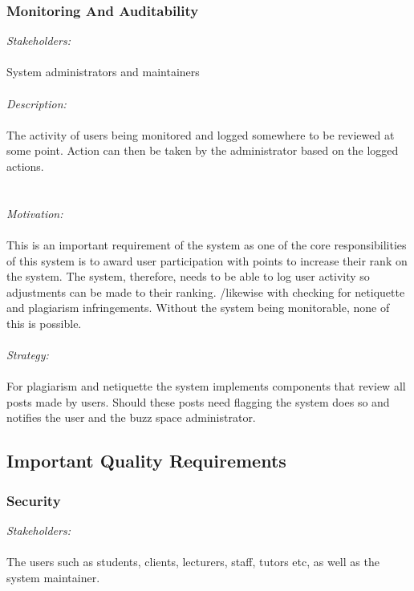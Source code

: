 \documentclass[a4paper,12pt]{report}
\begin{document}
		\subsubsection{Monitoring And Auditability}
		\emph{Stakeholders: }\\\\ System administrators and maintainers\\\\
		
		\emph{Description: }\\\\ The activity of users being monitored and logged somewhere to be reviewed at some point. Action can then be taken by the administrator based on the logged actions. \\\\	
		\\\emph{Motivation: }\\\\ This is an important requirement of the system as one of the core responsibilities of this system is to award user participation with points to increase their rank on the system. The system, therefore, needs to be able to log user activity so adjustments can be made to their ranking. /likewise with checking for netiquette and plagiarism infringements. Without the system being monitorable, none of this is possible. \\\\
		
		\emph{Strategy: }\\\\
		For plagiarism and netiquette the system implements components that review all posts made by users. Should these posts need flagging the system does so and notifies the user and the buzz space administrator. 
		
	\subsection{Important Quality Requirements}
		\subsubsection{Security}
		\emph{Stakeholders: }\\\\ The users such as students, clients, lecturers, staff, tutors etc,  as well as the system maintainer.\\
		
\end{document}
